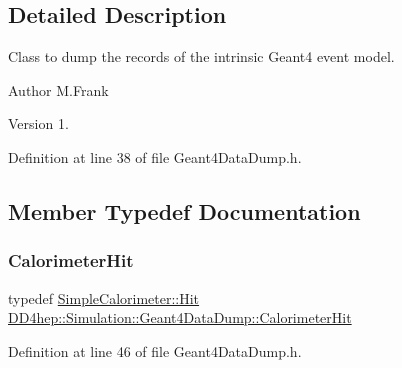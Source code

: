 \subsection{Detailed Description}
Class to dump the records of the intrinsic Geant4 event model. 

\begin{DoxyAuthor}{Author}
M.\+Frank 
\end{DoxyAuthor}
\begin{DoxyVersion}{Version}
1. 
\end{DoxyVersion}


Definition at line 38 of file Geant4\+Data\+Dump.\+h.



\subsection{Member Typedef Documentation}
\hypertarget{class_d_d4hep_1_1_simulation_1_1_geant4_data_dump_abbb746f00c083cdb09c3e0331cb920be}{}\label{class_d_d4hep_1_1_simulation_1_1_geant4_data_dump_abbb746f00c083cdb09c3e0331cb920be} 
\subsubsection{\texorpdfstring{Calorimeter\+Hit}{CalorimeterHit}}
{\footnotesize\ttfamily typedef \hyperlink{class_d_d4hep_1_1_simulation_1_1_geant4_calorimeter_1_1_hit}{Simple\+Calorimeter\+::\+Hit} \hyperlink{class_d_d4hep_1_1_simulation_1_1_geant4_data_dump_abbb746f00c083cdb09c3e0331cb920be}{D\+D4hep\+::\+Simulation\+::\+Geant4\+Data\+Dump\+::\+Calorimeter\+Hit}}



Definition at line 46 of file Geant4\+Data\+Dump.\+h.

\hypertarget{class_d_d4hep_1_1_simulation_1_1_geant4_data_dump_a405c85a9a72c4f1dc0164d4a61d98f75}{}\label{class_d_d4hep_1_1_simulation_1_1_geant4_data_dump_a405c85a9a72c4f1dc0164d4a61d98f75} 
